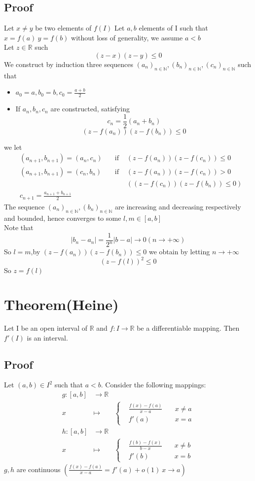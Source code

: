 \documentclass{book}
\newcommand{\abs}[1]{\left\lvert #1 \right\rvert}
\begin{document}
\subsection*{Proof}
Let $x\neq y$ be two elements of $f(I)$ Let $a,b$ elements of I such that $x=f(a) \ y=f(b)$ without loss of generality, we assume $a<b$
\\Let $z\in \mathbb{R}$ such $$(z-x)(z-y)\leq 0$$
We construct by induction  three sequences $(a_n)_{n\in \mathbb{N}},(b_n)_{n\in \mathbb{N}},(c_n)_{n\in \mathbb{N}}$ such that
\begin{itemize}
    \item $a_0=a,b_0=b,c_0=\frac{a+b}{2}$
    \item If $a_n,b_n,c_n$ are constructed, satisfying
    $$c_n=\frac{1}{2}(a_n+b_n)$$$$(z-f(a_n))(z-f(b_n))\leq0$$
    
\end{itemize}
we let $$\begin{aligned}
    &(a_{n+1},b_{n+1})=(a_n,c_n)\quad &\text{if }&(z-f(a_n))(z-f(c_n))\leq0\\
    &(a_{n+1},b_{n+1})=(c_n,b_n)\quad &\text{if }&(z-f(a_n))(z-f(c_n))>0\\
    & & &((z-f(c_n))(z-f(b_n))\leq 0)\\
    &c_{n+1}=\frac{a_{n+1}+b_{n+1}}{2}
\end{aligned}$$
The sequence $(a_n)_{n\in \mathbb{N}},(b_n)_{n\in \mathbb{N}}$ are increasing and decreasing respectively and bounded, hence converges to some $l,m\in[a,b]$
\\Note that $$\abs{b_n-a_n}=\frac{1}{2^n}\abs{b-a}\rightarrow 0(n\rightarrow+\infty)$$ So $l=m$,by $(z-f(a_n))(z-f(b_n))\leq 0$ we obtain by letting $n\rightarrow+\infty$$$(z-f(l))^2\leq0$$
So $z=f(l)$
\section{Theorem(Heine)}
Let I be an open interval of $\mathbb{R}$ and $f:I\rightarrow\mathbb{R}$ be a differentiable mapping. Then $f'(I)$ is an interval.
\subsection*{Proof}
Let $(a,b)\in I^2$ such that $a<b$. Consider the following mappings:
$$\begin{aligned}
    g: [a,b] &\rightarrow\mathbb{R}\\
    x&\mapsto &\left\{\begin{aligned}
        &\frac{f(x)-f(a)}{x-a}\quad &x\neq a\\ & f'(a) \quad &x=a
    \end{aligned}\right.\\
    h: [a,b]&\rightarrow\mathbb{R}\\
    x &\mapsto &\left\{\begin{aligned}
        &\frac{f(b)-f(x)}{b-x}\quad &x\neq b\\ & f'(b) \quad &x=b
    \end{aligned}\right.
\end{aligned}$$
$g,h$ are continuous $(\frac{f(x)-f(a)}{x-a}=f'(a)+o(1)\ x\rightarrow a)$
\end{document}

